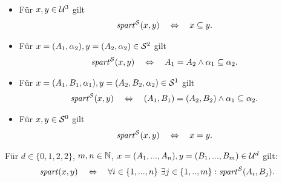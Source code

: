 \begin{dfn}[$\Gspart^\einf$]\ 
    \begin{itemize}
        \item Für $x,y \in \mathcal{U}^3$ gilt
            \begin{align*}
                \mathit{spart}^{\mathcal{S}}(x,y) 
                \quad \Leftrightarrow \quad 
                x \subseteq y.
            \end{align*}
        \item Für $x = (A_1,\alpha_2), y = (A_2,\alpha_2) \in \mathcal{S}^2$ gilt
            \begin{align*}
                \mathit{spart}^{\mathcal{S}}(x,y) 
                \quad \Leftrightarrow \quad 
                A_1 = A_2 \land \alpha_1 \subseteq \alpha_2.
            \end{align*}
        \item Für $x = (A_1,B_1,\alpha_1), y = (A_2,B_2,\alpha_2) \in \mathcal{S}^1$ gilt
            \begin{align*}
                \mathit{spart}^{\mathcal{S}}(x,y) 
                \quad \Leftrightarrow \quad 
                (A_1, B_1) = (A_2,B_2) \land \alpha_1 \subseteq \alpha_2.
            \end{align*}
        \item Für $x, y \in \mathcal{S}^0$ gilt
            \begin{align*}
                \mathit{spart}^{\mathcal{S}}(x,y) 
                \quad \Leftrightarrow \quad 
                x=y.
            \end{align*}
    \end{itemize}
\end{dfn}


\begin{dfn}[$\Gspart$]
    Für $d \in \{0,1,2,2\}$, $m,n \in \mathbb{N}$, $x=(A_1, ..., A_n), y=(B_1, ..., B_m) \in \mathcal{U}^d$ gilt:
    $$\mathit{spart}(x,y) \quad \Leftrightarrow \quad \forall i \in \{1, ..., n\}\ \exists j \in \{1, .., m\}: \mathit{spart}^{\mathcal{S}}(A_i,B_j). $$
\end{dfn}











% 

